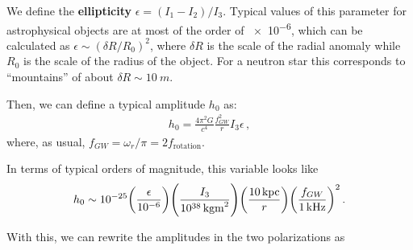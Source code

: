\documentclass[main.tex]{subfiles}
\begin{document}

We define the \textbf{ellipticity} \(\epsilon = (I_1 - I_2 ) / I_3 \). Typical values of this parameter for astrophysical objects are at most of the order of \num{e-6}, which can be calculated as \(\epsilon \sim ( \delta R / R_0 )^2\), where \(\delta R\) is the scale of the radial anomaly while  \(R_0 \) is the scale of the radius of the object.
For a neutron star this corresponds to ``mountains'' of about \(\delta R \sim \SI{10}{m}\).

Then, we can define a typical amplitude \(h_0 \) as: 
%
\begin{align} \label{eq:typical-amplitude-rigid-nonprecessing-body}
h_0 = \frac{4 \pi^2G}{c^{4}} \frac{f_{GW}^2}{r} I_3 \epsilon 
\,,
\end{align}
%
where, as usual, \(f_{GW} = \omega_{r} / \pi = 2 f _{\text{rotation}}\).

In terms of typical orders of magnitude, this variable looks like
%
\begin{align}
h_0 \sim \num{e-25} \qty(\frac{\epsilon }{\num{e-6}})
\qty( \frac{I_3}{\SI{e38}{kg m^2}})
\qty( \frac{\SI{10}{kpc}}{r})
\qty( \frac{f_{GW}}{\SI{1}{kHz}})^2
\,.
\end{align}

With this, we can rewrite the amplitudes in the two polarizations as 
%
\end{document}
